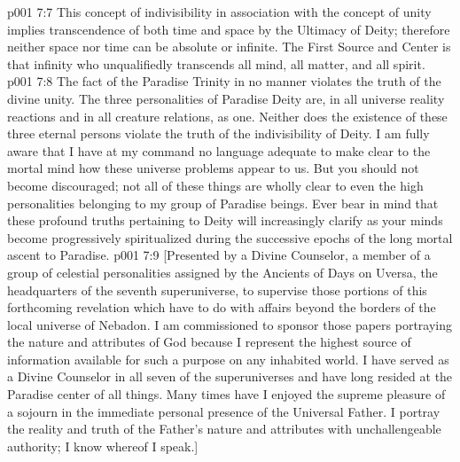 \vs p001 7:7 This concept of indivisibility in association with the concept of unity implies transcendence of both time and space by the Ultimacy of Deity; therefore neither space nor time can be absolute or infinite. The First Source and Center is that infinity who unqualifiedly transcends all mind, all matter, and all spirit.
\vs p001 7:8 The fact of the Paradise Trinity in no manner violates the truth of the divine unity. The three personalities of Paradise Deity are, in all universe reality reactions and in all creature relations, as one. Neither does the existence of these three eternal persons violate the truth of the indivisibility of Deity. I am fully aware that I have at my command no language adequate to make clear to the mortal mind how these universe problems appear to us. But you should not become discouraged; not all of these things are wholly clear to even the high personalities belonging to my group of Paradise beings. Ever bear in mind that these profound truths pertaining to Deity will increasingly clarify as your minds become progressively spiritualized during the successive epochs of the long mortal ascent to Paradise.
\vsetoff
\vs p001 7:9 [Presented by a Divine Counselor, a member of a group of celestial personalities assigned by the Ancients of Days on Uversa, the headquarters of the seventh superuniverse, to supervise those portions of this forthcoming revelation which have to do with affairs beyond the borders of the local universe of Nebadon. I am commissioned to sponsor those papers portraying the nature and attributes of God because I represent the highest source of information available for such a purpose on any inhabited world. I have served as a Divine Counselor in all seven of the superuniverses and have long resided at the Paradise center of all things. Many times have I enjoyed the supreme pleasure of a sojourn in the immediate personal presence of the Universal Father. I portray the reality and truth of the Father’s nature and attributes with unchallengeable authority; I know whereof I speak.]
